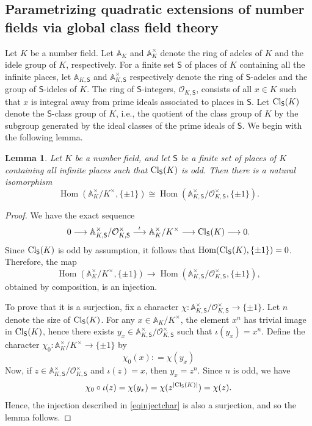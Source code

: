 \documentclass[10pt]{article}
\theoremstyle{plain}
\newtheorem{lemma}[thm]{Lemma}
\theoremstyle{definition}
\theoremstyle{remark}
\DeclareMathOperator{\Cl}{Cl}
\DeclareMathOperator{\Hom}{Hom}
\def\CS{{\mathsf S}}
\def\Cl{{\rm Cl}}
\def\O{{\mathcal O}}
\newcommand{\A}{\mathbb{A}}
\begin{document}
\subsection{Parametrizing quadratic extensions of number fields
  via global class field theory}\label{3.1}

Let $K$ be a number field. Let $\A_K$ and $\A_K^\times$ denote the
ring of adeles of $K$ and the idele group of $K$, respectively. For a
finite set $\CS$ of places of $K$ containing all the infinite places,
let $\A_{K,\CS}$ and $\A_{K,\CS}^\times$ respectively denote the ring
of $\CS$-adeles and the group of $\CS$-ideles of $K$.  The ring of
$\CS$-integers, $\O_{K,\CS}$, consists of all $x \in K$ such that $x$
is integral away from prime ideals associated to places in $\CS$.
Let $\Cl_\CS(K)$ denote the $\CS$-class group of $K$, i.e., the
quotient of the class group of $K$ by the subgroup generated by the
ideal classes of the prime ideals of $\CS$. We begin with the
following lemma.


\begin{lemma}\label{lemcftosbij}
Let $K$ be a number field, and let $\CS$ be a finite set of places of
$K$ containing all infinite places such that $\Cl_{\CS}(K)$ is
odd. Then there is a natural isomorphism
\begin{equation*}
  \Hom(\A_K^\times/K^\times,\{\pm 1\})\cong
  \Hom(\A_{K,\CS}^\times/\O_{K,\CS}^\times,\{\pm 1\}).
\end{equation*}
\end{lemma}
\begin{proof}
We have the exact sequence
\begin{equation}\label{Sexactsequence}
0\longrightarrow\A_{K,\CS}^\times/\O_{K,\CS}^\times
\stackrel{\iota}{\longrightarrow}
\A_K^\times/K^\times\longrightarrow\Cl_\CS(K)\longrightarrow0.
\end{equation}
Since $\Cl_\CS(K)$ is odd by assumption, it follows that
$\Hom(\Cl_\CS(K),\{\pm 1\})=0$. Therefore, the map
\begin{equation}\label{eqinjectchar}
  \Hom(\A_K^\times/K^\times,\{\pm 1\})\to
  \Hom(\A_{K,\CS}^\times/\O_{K,\CS}^\times,\{\pm 1\}),
\end{equation}
obtained by composition, is an injection. 

To prove that it is a surjection, fix a character
$\chi:\A_{K,\CS}^\times/\O_{K,\CS}^\times\to\{\pm 1\}$. Let $n$ denote
the size of $\Cl_\CS(K)$. For any $x\in\A_K/K^\times$, the element
$x^{n}$ has trivial image in $\Cl_\CS(K)$, hence there exists $y_x \in
\A_{K,\CS}^\times/\O_{K,\CS}^\times$ such that $\iota(y_x)=
x^{n}$. Define the character
$\chi_0:\A_K^\times/K^\times\to\{\pm 1\}$ by
$$\chi_0(x): =\chi(y_x)$$ Now, if $z \in
\A_{K,\CS}^\times/\O_{K,\CS}^\times$ and $\iota(z) = x$, then $y_x =
z^{n}$. Since $n$ is odd, we have $$\chi_0 \circ \iota(z) = \chi(y_x)
= \chi(z^{|\Cl_\CS(K)|}) = \chi(z).$$ Hence, the injection described
in \eqref{eqinjectchar} is also a surjection, and so the lemma
follows.
\end{proof}
\end{document}
